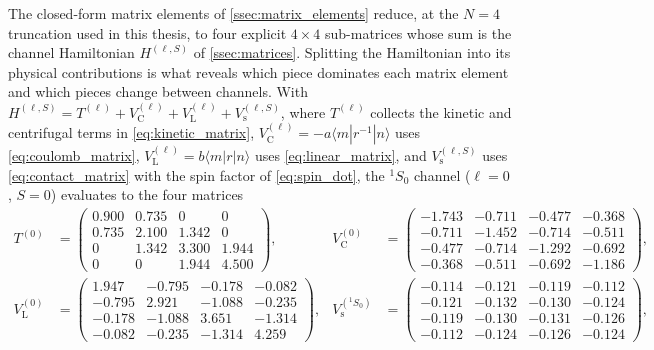 The closed-form matrix elements of \cref{ssec:matrix_elements} reduce, at
the $N=4$ truncation used in this thesis, to four explicit
$4\times 4$ sub-matrices whose sum is the channel Hamiltonian
$H^{(\ell,S)}$ of \cref{ssec:matrices}. Splitting the Hamiltonian into
its physical contributions is what reveals which piece dominates each
matrix element and which pieces change between channels. With
$H^{(\ell,S)} = T^{(\ell)} + V_{\mathrm{C}}^{(\ell)}
                + V_{\mathrm{L}}^{(\ell)} + V_{\mathrm{s}}^{(\ell,S)}$,
where $T^{(\ell)}$ collects the kinetic and centrifugal terms in
\cref{eq:kinetic_matrix}, $V_{\mathrm{C}}^{(\ell)} = -a\langle
m|r^{-1}|n\rangle$ uses \cref{eq:coulomb_matrix},
$V_{\mathrm{L}}^{(\ell)} = b\langle m|r|n\rangle$ uses
\cref{eq:linear_matrix}, and $V_{\mathrm{s}}^{(\ell,S)}$ uses
\cref{eq:contact_matrix} with the spin factor of \cref{eq:spin_dot},
the ${}^1S_0$ channel ($\ell=0$, $S=0$) evaluates to the four matrices
\begin{align}
T^{(0)} &= \begin{pmatrix}
   0.900 &  0.735 &  0      &  0     \\
   0.735 &  2.100 &  1.342  &  0     \\
   0     &  1.342 &  3.300  &  1.944 \\
   0     &  0     &  1.944  &  4.500
\end{pmatrix},
&
V_{\mathrm{C}}^{(0)} &= \begin{pmatrix}
  -1.743 & -0.711 & -0.477 & -0.368 \\
  -0.711 & -1.452 & -0.714 & -0.511 \\
  -0.477 & -0.714 & -1.292 & -0.692 \\
  -0.368 & -0.511 & -0.692 & -1.186
\end{pmatrix},
\label{eq:T_VC_N4}
\\[6pt]
V_{\mathrm{L}}^{(0)} &= \begin{pmatrix}
   1.947 & -0.795 & -0.178 & -0.082 \\
  -0.795 &  2.921 & -1.088 & -0.235 \\
  -0.178 & -1.088 &  3.651 & -1.314 \\
  -0.082 & -0.235 & -1.314 &  4.259
\end{pmatrix},
&
V_{\mathrm{s}}^{({}^1S_0)} &= \begin{pmatrix}
  -0.114 & -0.121 & -0.119 & -0.112 \\
  -0.121 & -0.132 & -0.130 & -0.124 \\
  -0.119 & -0.130 & -0.131 & -0.126 \\
  -0.112 & -0.124 & -0.126 & -0.124
\end{pmatrix},
\label{eq:VL_Vs_N4}
\end{align}
